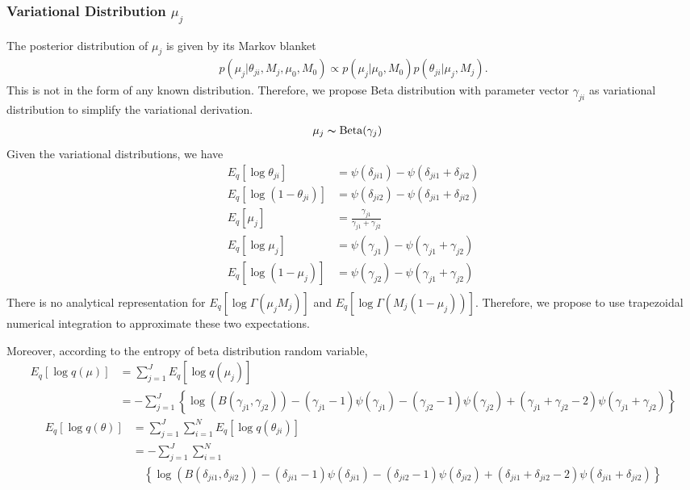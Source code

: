 \documentclass[11pt,reqno]{amsart}
\begin{document}
\subsubsection{Variational Distribution $\mu_j$}
The posterior distribution of $\mu_j$ is given by its Markov blanket
\begin{align}
p(\mu_j|\theta_{ji},M_j,\mu_0,M_0)\propto p(\mu_j|\mu_0,M_0)p(\theta_{ji}|\mu_j,M_j).
\end{align}
This is not in the form of any known distribution. Therefore, we propose Beta distribution with parameter vector $\gamma_{ji}$ as variational distribution to simplify the variational derivation.
\begin{align}
\mu_j &\thicksim \text{Beta}(\gamma_j) \nonumber
\end{align}
%
Given the variational distributions, we have
\begin{align}
E_q \left[ \log \theta_{ji} \right] &= \psi(\delta_{ji1}) - \psi(\delta_{ji1}+\delta_{ji2}) \nonumber \\
E_q \left[ \log \left( 1 - \theta_{ji}\right) \right]&= \psi(\delta_{ji2}) - \psi(\delta_{ji1}+\delta_{ji2}) \nonumber \\
E_q \left[ \mu_j \right] &= \frac{\gamma_{j1}}{\gamma_{j1} + \gamma_{j2}} \nonumber \\
E_q  \left[ \log \mu_j \right] &= \psi(\gamma_{j1}) - \psi(\gamma_{j1}+\gamma_{j2}) \nonumber \\
E_q  \left[ \log (1 - \mu_j)\right] &= \psi(\gamma_{j2}) - \psi(\gamma_{j1}+\gamma_{j2})\nonumber \\
\end{align}
There is no analytical representation for $  E_q  \left[ \log \Gamma(\mu_j M_j) \right] $ and $ E_q  \left[ \log \Gamma(M_j (1-\mu_j)) \right] $. Therefore, we propose to use trapezoidal numerical integration to approximate these two expectations.

Moreover, according to the entropy of beta distribution random variable,
\begin{equation}
\begin{split}
E_q \left[ \log q\left(\mu \right)\right] &= \sum_{j=1}^{J} E_q \left[ \log q(\mu_j)\right] \\
&= -\sum_{j=1}^{J} \left\lbrace \log (B(\gamma_{j1},\gamma_{j2}))-(\gamma_{j1}-1)\psi(\gamma_{j1})-(\gamma_{j2}-1)\psi(\gamma_{j2})
+ (\gamma_{j1}+\gamma_{j2}-2)\psi(\gamma_{j1}+\gamma_{j2})\right\rbrace
\end{split}
\end{equation}
\begin{equation}
\begin{split}
E_q \left[ \log q\left(\theta \right)\right] &= \sum_{j=1}^{J}\sum_{i=1}^{N} E_q\left[ \log q(\theta_{ji})\right] \\
&= -\sum_{j=1}^{J}\sum_{i=1}^{N} \\
&\quad \left\lbrace \log (B(\delta_{ji1},\delta_{ji2}))-(\delta_{ji1}-1)\psi(\delta_{ji1})-(\delta_{ji2}-1)\psi(\delta_{ji2})
+ (\delta_{ji1}+\delta_{ji2}-2)\psi(\delta_{ji1}+\delta_{ji2})\right\rbrace
\end{split}
\end{equation}
\end{document}
